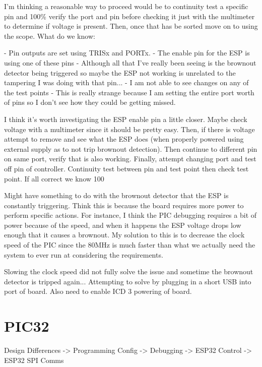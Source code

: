 I'm thinking a reasonable way to proceed would be to continuity test
a specific pin and 100\% verify the port and pin before checking it just
with the multimeter to determine if voltage is present. Then, once that
has be sorted move on to using the scope.
What do we know:

    - Pin outputs are set using TRISx and PORTx.
    - The enable pin for the ESP is using one of these pins
        - Although all that I've really been seeing
        is the brownout detector being triggered
        so maybe the ESP not working is unrelated to the
        tampering I was doing with that pin...
    - I am not able to see changes on any of the test points
        - This is really strange because I am setting the entire port
        worth of pins so I don't see how they could be getting missed.

I think it's worth investigating the ESP enable pin a little closer.
Maybe check voltage with a multimeter since it should be pretty easy.
Then, if there is voltage attempt to remove and see what the ESP does
(when properly powered using external supply as to not trip
brownout detection).
Then continue to different pin on same port, verify that is also working.
Finally, attempt changing port and test off pin of controller.
Continuity test between pin and test point then check test point.
If all correct we know 100%

Might have something to do with the brownout detector that the ESP is constantly triggering.
Think this is because the board requires more power to perform specific actions.
For instance, I think the PIC debugging requires a bit of power because of the speed,
and when it happens the ESP voltage drops low enough that it causes a brownout.
My solution to this is to decrease the clock speed of the PIC since the 80MHz is much
faster than what we actually need the system to ever run at considering the requirements.

Slowing the clock speed did not fully solve the issue and sometime the brownout detector
is tripped again...
Attempting to solve by plugging in a short USB into port of board.
Also need to enable ICD 3 powering of board.

\section{PIC32}
Design Differences -> Programming Config -> Debugging -> ESP32 Control -> ESP32 SPI Comms

